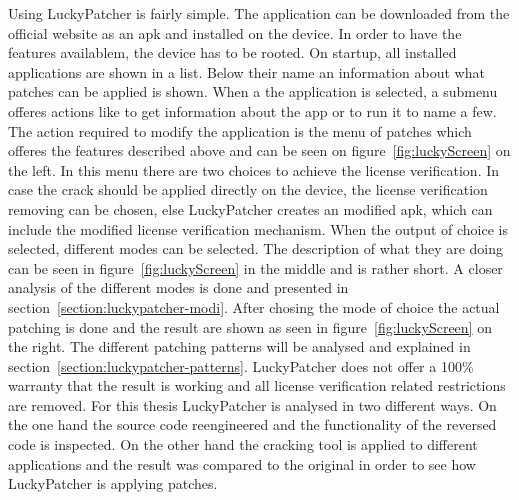 Using LuckyPatcher is fairly simple.
The application can be downloaded from the official website \cite{luckyPatcherOfficial} as an \gls{apk} and installed on the device.
In order to have the features availablem, the device has to be rooted.
On startup, all installed applications are shown in a list.
Below their name an information about what patches can be applied is shown.
When a the application is selected, a submenu offeres actions like to get information about the app or to run it to name a few.
The action required to modify the application is the menu of patches which offeres the features described above and can be seen on figure~\ref{fig:luckyScreen} on the left.
In this menu there are two choices to achieve the license verification.
In case the crack should be applied directly on the device, the license verification removing can be chosen, else LuckyPatcher creates an modified apk, which can include the modified license verification mechanism.
When the output of choice is selected, different modes can be selected.
The description of what they are doing can be seen in figure~\ref{fig:luckyScreen} in the middle and is rather short.
A closer analysis of the different modes is done and presented in section~\ref{section:luckypatcher-modi}.
After chosing the mode of choice the actual patching is done and the result are shown as seen in figure~\ref{fig:luckyScreen} on the right.
The different patching patterns will be analysed and explained in section~\ref{section:luckypatcher-patterns}.
LuckyPatcher does not offer a 100\% warranty that the result is working and all license verification related restrictions are removed.
\newline
For this thesis LuckyPatcher is analysed in two different ways.
On the one hand the source code reengineered and the functionality of the reversed code is inspected.
On the other hand the cracking tool is applied to different applications and the result was compared to the original in order to see how LuckyPatcher is applying patches.


